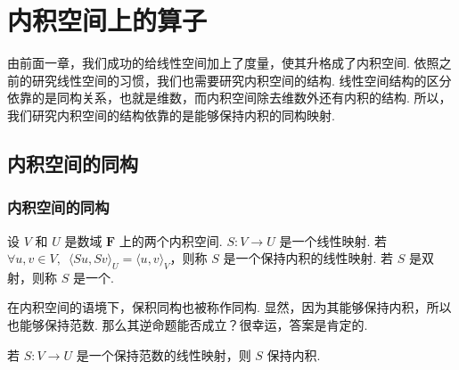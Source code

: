 \chapter{内积空间上的算子}

由前面一章，我们成功的给线性空间加上了度量，使其升格成了内积空间. 依照之前的研究线性空间的习惯，我们也需要研究内积空间的结构. 线性空间结构的区分依靠的是同构关系，也就是维数，而内积空间除去维数外还有内积的结构. 所以，我们研究内积空间的结构依靠的是能够保持内积的同构映射.

\section{内积空间的同构}

\subsection{内积空间的同构}

\begin{definition}{}{}
    设 $ V $ 和 $ U $ 是数域 $ \mathbf{F} $ 上的两个内积空间. $ S: V \rightarrow U $ 是一个线性映射. 若 $ \forall u, v \in V,\enspace \langle Su, Sv \rangle_U = \langle u, v \rangle_V $，则称 $ S $ 是一个保持内积的线性映射. 若 $ S $ 是双射，则称 $ S $ 是一个.
\end{definition}

在内积空间的语境下，保积同构也被称作同构. 显然，因为其能够保持内积，所以也能够保持范数. 那么其逆命题能否成立？很幸运，答案是肯定的.

\begin{theorem}{}{}
    若 $ S : V \rightarrow U $ 是一个保持范数的线性映射，则 $ S $ 保持内积.
\end{theorem}

